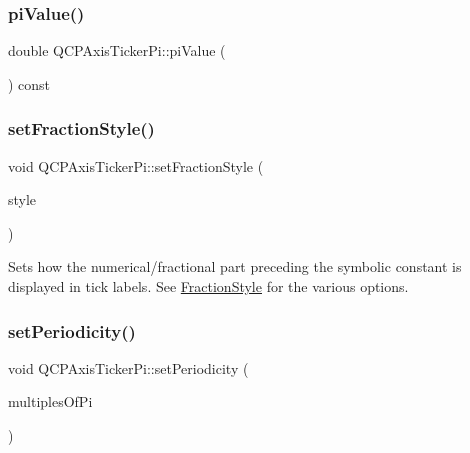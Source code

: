 \mbox{\label{class_q_c_p_axis_ticker_pi_abddc18799caa4ae6c721e1e5e229b3a4}} 
\subsubsection{\texorpdfstring{pi\+Value()}{piValue()}}
{\footnotesize\ttfamily double Q\+C\+P\+Axis\+Ticker\+Pi\+::pi\+Value (\begin{DoxyParamCaption}{ }\end{DoxyParamCaption}) const\hspace{0.3cm}{\ttfamily [inline]}}

\mbox{\label{class_q_c_p_axis_ticker_pi_a760c8af6ca68178e607556c4e5049d71}} 
\subsubsection{\texorpdfstring{set\+Fraction\+Style()}{setFractionStyle()}}
{\footnotesize\ttfamily void Q\+C\+P\+Axis\+Ticker\+Pi\+::set\+Fraction\+Style (\begin{DoxyParamCaption}\item[{\hyperlink{class_q_c_p_axis_ticker_pi_a262f1534c7f0c79a7d5237f5d1e2c54c}{Q\+C\+P\+Axis\+Ticker\+Pi\+::\+Fraction\+Style}}]{style }\end{DoxyParamCaption})}

Sets how the numerical/fractional part preceding the symbolic constant is displayed in tick labels. See \hyperlink{class_q_c_p_axis_ticker_pi_a262f1534c7f0c79a7d5237f5d1e2c54c}{Fraction\+Style} for the various options. \mbox{\label{class_q_c_p_axis_ticker_pi_a58f538dc01860fb56e46970e28a87f03}} 
\subsubsection{\texorpdfstring{set\+Periodicity()}{setPeriodicity()}}
{\footnotesize\ttfamily void Q\+C\+P\+Axis\+Ticker\+Pi\+::set\+Periodicity (\begin{DoxyParamCaption}\item[{int}]{multiples\+Of\+Pi }\end{DoxyParamCaption})}

